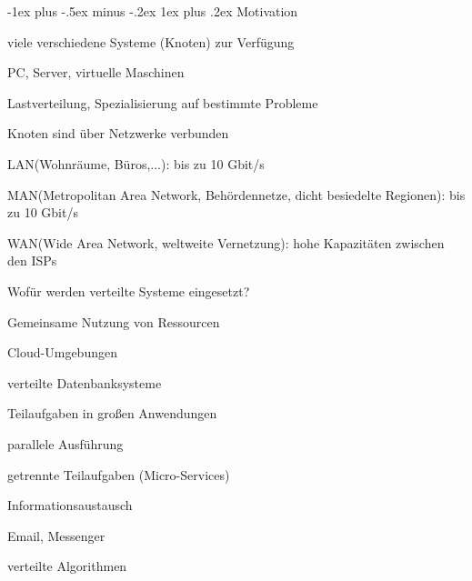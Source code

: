 \documentclass[10pt]{article}
\makeatletter
\renewcommand{\subsubsection}{\@startsection{subsubsection}{3}{0mm}%
                                {-1ex plus -.5ex minus -.2ex}%
                                {1ex plus .2ex}%
                                {\normalfont\small\bfseries}}
\makeatother
\begin{document}
  \subsubsection{Motivation}
  \begin{itemize*}
    \item viele verschiedene Systeme (Knoten) zur Verfügung
    \begin{itemize*}
      \item PC, Server, virtuelle Maschinen
      \item Lastverteilung, Spezialisierung auf bestimmte Probleme
    \end{itemize*}
    \item Knoten sind über Netzwerke verbunden
    \begin{itemize*}
      \item LAN(Wohnräume, Büros,...): bis zu 10 Gbit/s
      \item MAN(Metropolitan Area Network, Behördennetze, dicht besiedelte Regionen): bis zu 10 Gbit/s
      \item WAN(Wide Area Network, weltweite Vernetzung): hohe Kapazitäten zwischen den ISPs
    \end{itemize*}
  \end{itemize*}
  
  Wofür werden verteilte Systeme eingesetzt? 
  \begin{itemize*}
    \item Gemeinsame Nutzung von Ressourcen
    \begin{itemize*}
      \item Cloud-Umgebungen
      \item verteilte Datenbanksysteme
    \end{itemize*}
    \item Teilaufgaben in großen Anwendungen
    \begin{itemize*}
      \item parallele Ausführung
      \item getrennte Teilaufgaben (Micro-Services)
    \end{itemize*}
    \item Informationsaustausch
    \begin{itemize*}
      \item Email, Messenger
      \item verteilte Algorithmen
    \end{itemize*}
  \end{itemize*}
  
\end{document}
